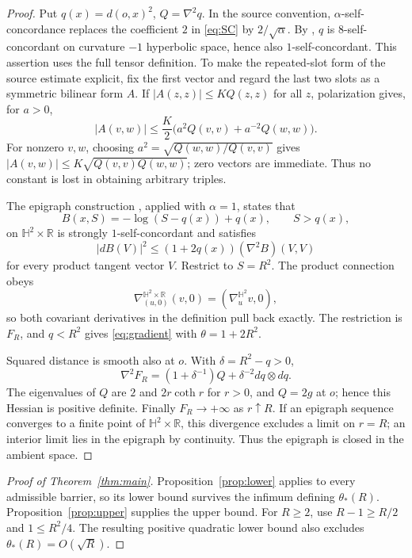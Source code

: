 \documentclass[11pt]{article}
\newcommand{\HH}{\mathbb H}
\newcommand{\R}{\mathbb R}
\begin{document}
\begin{proof}
Put \(q(x)=d(o,x)^2\), \(Q=\nabla^2q\).
In the source convention, \(\alpha\)-self-concordance replaces the
coefficient \(2\) in \eqref{eq:SC} by \(2/\sqrt\alpha\).
By \cite[Theorem~5.16(i)]{HNW}, \(q\) is \(8\)-self-concordant on
curvature \(-1\) hyperbolic space, hence also \(1\)-self-concordant.
This assertion uses the full tensor definition. To make the repeated-slot
form of the source estimate explicit, fix the first vector and regard the
last two slots as a symmetric bilinear form \(A\). If
\(|A(z,z)|\leq KQ(z,z)\) for all \(z\), polarization gives, for \(a>0\),
\[
 |A(v,w)|\leq\frac K2\bigl(a^2Q(v,v)+a^{-2}Q(w,w)\bigr).
\]
For nonzero \(v,w\), choosing
\(a^2=\sqrt{Q(w,w)/Q(v,v)}\) gives
\(|A(v,w)|\leq K\sqrt{Q(v,v)Q(w,w)}\); zero vectors are immediate.
Thus no constant is lost in obtaining arbitrary triples.

The epigraph construction \cite[Theorem~1.6]{HNW}, applied with
\(\alpha=1\), states that
\[
 B(x,S)=-\log(S-q(x))+q(x),\qquad S>q(x),
\]
on \(\HH^2\times\R\) is strongly \(1\)-self-concordant and satisfies
\[
 |dB(V)|^2\leq(1+2q(x))(\nabla^2B)(V,V)
\]
for every product tangent vector \(V\). Restrict to \(S=R^2\).
The product connection obeys
\[
 \nabla^{\HH^2\times\R}_{(u,0)}(v,0)=(\nabla^{\HH^2}_uv,0),
\]
so both covariant derivatives in the definition pull back exactly.
The restriction is \(F_R\), and \(q<R^2\) gives
\eqref{eq:gradient} with \(\theta=1+2R^2\).

Squared distance is smooth also at \(o\). With \(\delta=R^2-q>0\),
\[
 \nabla^2F_R=(1+\delta^{-1})Q+\delta^{-2}dq\otimes dq.
\]
The eigenvalues of \(Q\) are \(2\) and \(2r\coth r\) for \(r>0\),
and \(Q=2g\) at \(o\); hence this Hessian is positive definite.
Finally \(F_R\to+\infty\) as \(r\uparrow R\).
If an epigraph sequence converges to a finite point of
\(\HH^2\times\R\), this divergence excludes a limit on \(r=R\);
an interior limit lies in the epigraph by continuity. Thus the epigraph
is closed in the ambient space.
\end{proof}

\begin{proof}[Proof of Theorem~\ref{thm:main}]
Proposition~\ref{prop:lower} applies to every admissible barrier, so its
lower bound survives the infimum defining \(\theta_*(R)\).
Proposition~\ref{prop:upper} supplies the upper bound.
For \(R\geq2\), use \(R-1\geq R/2\) and \(1\leq R^2/4\).
The resulting positive quadratic lower bound also excludes
\(\theta_*(R)=O(\sqrt R)\).
\end{proof}
\end{document}
